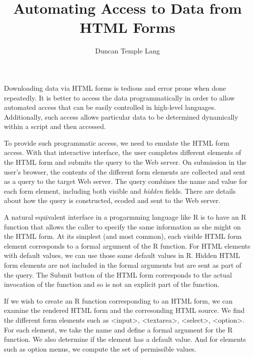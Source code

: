 \documentclass{article}
\title{Automating Access to Data from HTML Forms}
\author{Duncan Temple Lang}
\def\HTMLTag#1{<#1>}
\begin{document}
\maketitle

Downloading data via HTML forms is tedious and error prone when done
repeatedly.  It is better to access the data programmatically in order
to allow automated access that can be easily controlled in high-level
languages.  Additionally, such access allows particular data to be
determined dynamically within a script and then accessed.

To provide such programmatic access, we need to emulate the HTML form
access.  With that interactive interface, the user completes different
elements of the HTML form and submits the query to the Web server.  On
submission in the user's browser, the contents of the different form
elements are collected and sent as a query to the target Web server.
The query combines the name and value for each form element, including
both visible and \textit{hidden} fields.  There are details about how
the query is constructed, ecoded and sent to the Web server.

A natural equivalent interface in a progarmming language like R is to
have an R function that allows the caller to specify the same
information as she might on the HTML form.  At its simplest (and most
common), each visible HTML form element corresponds to a formal
argument of the R function.  For HTML elements with default values, we
can use those same default values in R.  Hidden HTML form elements are
not included in the formal arguments but are sent as part of the
query.  The Submit button of the HTML form corresponds to the actual
invocation of the function and so is not an explicit part of the
function.

If we wish to create an R function corresponding to 
an HTML form, we can examine the rendered HTML form and
the corresonding HTML source.  
We find the different form elements such as
\HTMLTag{input},
\HTMLTag{textarea}, \HTMLTag{select}, \HTMLTag{option}.
For each element, we take the name 
and define a formal argument for the R function.
We also determine if the element has a default value.
And for elements such as option menus,
we compute the set of permissible values.
\end{document}
